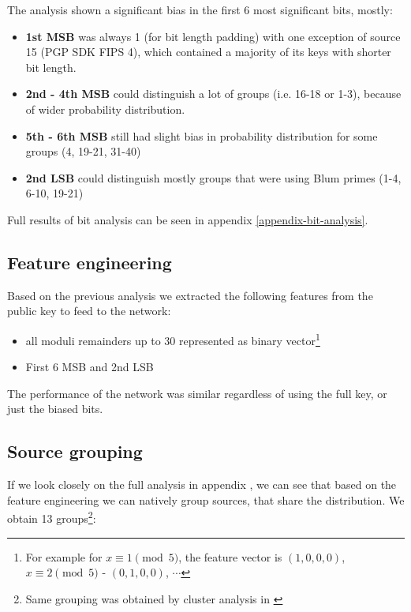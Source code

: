 The analysis shown a significant bias in the first 6 most significant bits, mostly:

\begin{itemize}

\item \textbf{1st MSB} was always 1 (for bit length padding) with one exception of source 15 (PGP SDK FIPS 4), which contained a majority of its keys with shorter bit length.

\item \textbf{2nd - 4th MSB} could distinguish a lot of groups (i.e. 16-18 or 1-3), because of wider probability distribution.

\item \textbf{5th - 6th MSB} still had slight bias in probability distribution for some groups (4, 19-21, 31-40)

\item \textbf{2nd LSB} could distinguish mostly groups that were using Blum primes (1-4, 6-10, 19-21)

\end{itemize}

\noindent
Full results of bit analysis can be seen in appendix \ref{appendix-bit-analysis}.

\subsection{Feature engineering}

\label{feature-engineering}

Based on the previous analysis we extracted the following features from the public key to feed to the network:

\begin{itemize}

\item all moduli remainders up to 30 represented as binary vector\footnote{For example for $x \equiv 1 \pmod{5}$, the feature vector is $(1,0,0,0)$, $x \equiv 2 \pmod{5}$ - $(0,1,0,0)$, $\cdots$}

\item First 6 MSB and 2nd LSB

\end{itemize}

\noindent
The performance of the network was similar regardless of using the full key, or just the biased bits.

\subsection{Source grouping}
If we look closely on the full analysis in appendix \label{appendix-analysis}, we can see that based on the feature engineering we can natively group sources, that share the distribution. We obtain 13 groups\footnote{Same grouping was obtained by cluster analysis in \cite{svenda_1}}:


